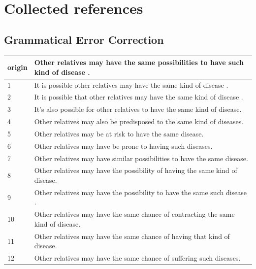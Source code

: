 \documentclass[letterpaper, 11pt]{article}
\begin{document}
\section{Collected references}\label{ap:crowd}
\subsection{Grammatical Error Correction}
\begin{table}[]
	\centering
	\begin{tabular}{ll}
		\cline{1-1}
		\multicolumn{1}{|l|}{origin} & Other relatives may have the same possibilities to have such kind of disease .        \\ \hline
		1                            & It is possible other relatives may have the same kind of disease .                    \\
		2                            & It is possible that other relatives may have the same kind of disease .               \\
		3                            & It's also possible for other relatives to have the same kind of disease.              \\
		4                            & Other relatives may also be predisposed to the same kind of diseases.                 \\
		5                            & Other relatives may be at risk to have the same disease.                              \\
		6                            & Other relatives may have be prone to having such diseases.                            \\
		7                            & Other relatives may have similar possibilities to have the same disease.              \\
		8                            & Other relatives may have the possibility of having the same kind of disease.          \\
		9                            & Other relatives may have the possibility to have the same such disease .              \\
		10                           & Other relatives may have the same chance of contracting the same kind of disease.     \\
		11                           & Other relatives may have the same chance of having that kind of disease.              \\
		12                           & Other relatives may have the same chance of suffering such diseases.                  \\

\end{tabular}
\end{table}
\end{document}
